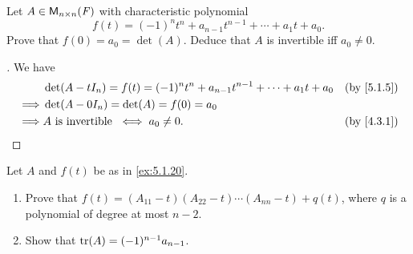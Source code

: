 \begin{ex}\label{ex:5.1.20}
	Let \(A \in \ms[n][n][\F]\) with characteristic polynomial
	\[
		f(t) = (-1)^n t^n + a_{n - 1} t^{n - 1} + \cdots + a_1 t + a_0.
	\]
	Prove that \(f(0) = a_0 = \det(A)\).
	Deduce that \(A\) is invertible iff \(a_0 \neq 0\).
\end{ex}

\begin{proof}[]
	We have
	\begin{align*}
		         & \det(A - t I_n) = f(t) = (-1)^n t^n + a_{n - 1} t^{n - 1} + \cdots + a_1 t + a_0 &  & \by{5.1.5} \\
		\implies & \det(A - 0 I_n) = \det(A) = f(0) = a_0                                                           \\
		\implies & A \text{ is invertible } \iff a_0 \neq 0.                                        &  & \by{4.3.1}
	\end{align*}
\end{proof}

\begin{ex}\label{ex:5.1.21}
	Let \(A\) and \(f(t)\) be as in \cref{ex:5.1.20}.
	\begin{enumerate}
		\item Prove that \(f(t) = (A_{1 1} - t)(A_{2 2} - t) \cdots (A_{n n} - t) + q(t)\), where \(q\) is a polynomial of degree at most \(n - 2\).
		\item Show that \(\tr(A) = (-1)^{n - 1} a_{n - 1}\).
	\end{enumerate}
\end{ex}

